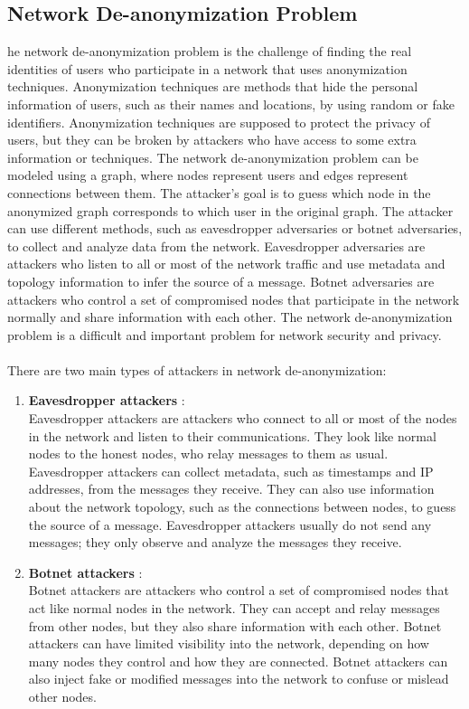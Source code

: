 \subsection{Network De-anonymization Problem}
he network de-anonymization problem is the challenge of finding the real identities of users who participate in a network that uses anonymization techniques. Anonymization techniques are methods that hide the personal information of users, such as their names and locations, by using random or fake identifiers. Anonymization techniques are supposed to protect the privacy of users, but they can be broken by attackers who have access to some extra information or techniques. The network de-anonymization problem can be modeled using a graph, where nodes represent users and edges represent connections between them. The attacker’s goal is to guess which node in the anonymized graph corresponds to which user in the original graph. The attacker can use different methods, such as eavesdropper adversaries or botnet adversaries, to collect and analyze data from the network. Eavesdropper adversaries are attackers who listen to all or most of the network traffic and use metadata and topology information to infer the source of a message. Botnet adversaries are attackers who control a set of compromised nodes that participate in the network normally and share information with each other. The network de-anonymization problem is a difficult and important problem for network security and privacy.\\\\
There are two main types of attackers in network de-anonymization:
\begin{enumerate}
	\item \textbf{Eavesdropper attackers} :\\ Eavesdropper attackers are attackers who connect to all or most of the nodes in the network and listen to their communications. They look like normal nodes to the honest nodes, who relay messages to them as usual. Eavesdropper attackers can collect metadata, such as timestamps and IP addresses, from the messages they receive. They can also use information about the network topology, such as the connections between nodes, to guess the source of a message. Eavesdropper attackers usually do not send any messages; they only observe and analyze the messages they receive.
	\item \textbf{Botnet attackers} : \\
	Botnet attackers are attackers who control a set of compromised nodes that act like normal nodes in the network. They can accept and relay messages from other nodes, but they also share information with each other. Botnet attackers can have limited visibility into the network, depending on how many nodes they control and how they are connected. Botnet attackers can also inject fake or modified messages into the network to confuse or mislead other nodes.
\end{enumerate}
